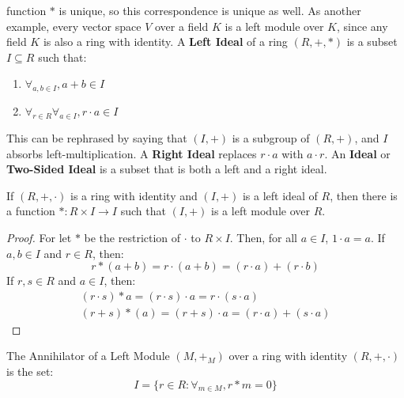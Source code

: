 \documentclass[crop=false,class=book,oneside]{standalone}
\begin{document}
        function $*$ is unique, so this correspondence is
        unique as well. As another example, every vector space
        $V$ over a field $K$ is a left module over $K$, since
        any field $K$ is also a ring with identity.
        A \textbf{Left Ideal} of a ring $(R,+,*)$ is a subset
        $I\subseteq{R}$ such that:
        \begin{enumerate}
            \item $\forall_{a,b\in{I}},a+b\in{I}$
            \item $\forall_{r\in{R}}\forall_{a\in{I}},%
                   r\cdot{a}\in{I}$
        \end{enumerate}
        This can be rephrased by saying that $(I,+)$ is a subgroup
        of $(R,+)$, and $I$ absorbs left-multiplication. A
        \textbf{Right Ideal} replaces $r\cdot{a}$ with
        $a\cdot{r}$. An \textbf{Ideal} or \textbf{Two-Sided Ideal}
        is a subset that is both a left and a right ideal.
        \begin{theorem}
            If $(R,+,\cdot)$ is a ring with identity
            and $(I,+)$ is a left ideal
            of $R$, then there is a function
            $*:R\times{I}\rightarrow{I}$ such that
            $(I,+)$ is a left module over $R$.
        \end{theorem}
        \begin{proof}
            For let $*$ be the restriction of $\cdot$ to
            $R\times{I}$. Then, for all $a\in{I}$,
            $1\cdot{a}=a$. If $a,b\in{I}$ and $r\in{R}$, then:
            \begin{equation*}
                r*(a+b)
                =r\cdot(a+b)
                =(r\cdot{a})+(r\cdot{b})
            \end{equation*}
            If $r,s\in{R}$ and $a\in{I}$, then:
            \begin{gather*}
                (r\cdot{s})*a
                =(r\cdot{s})\cdot{a}
                =r\cdot(s\cdot{a})\\
                (r+s)*(a)
                =(r+s)\cdot{a}
                =(r\cdot{a})+(s\cdot{a})
            \end{gather*}
        \end{proof}
        \begin{definition}
            The Annihilator of a Left Module $(M,+_{M})$ over
            a ring with identity $(R,+,\cdot)$ is the set:
            \begin{equation*}
                I=\{r\in{R}:\forall_{m\in{M}},r*m=0\}
            \end{equation*}
        \end{definition}
\end{document}
